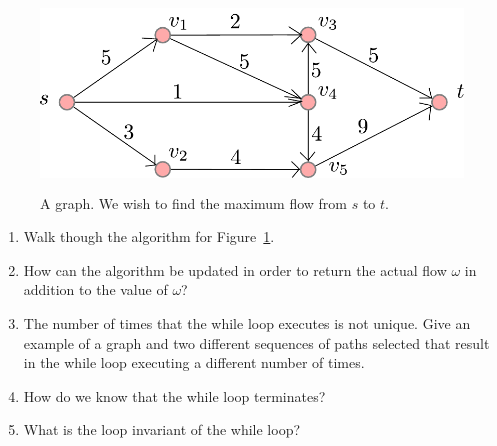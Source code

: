 \documentclass{article}
\begin{document}
\begin{figure}
    \centering
    \includegraphics[height=2in]{figs/graph}
    \caption{A graph.  We wish to find the maximum flow from $s$ to
    $t$.}\label{fig:graph}
\end{figure}

\newpage
\begin{enumerate}
    \item Walk though the algorithm for Figure~\ref{fig:graph}.
    \item How can the algorithm be updated in order to return the actual flow
        $\omega$ in addition to the value of $\omega$?
    \item The number of times that the while loop executes is not unique.  Give
        an example of a graph and two different sequences of paths selected that
        result in the while loop executing a different number of times.
    \item How do we know that the while loop terminates?
    \item What is the loop invariant of the while loop?
\end{enumerate}
\end{document}
